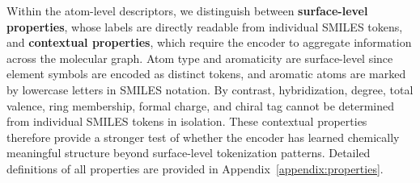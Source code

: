 Within the atom-level descriptors, we distinguish between \textbf{surface-level properties}, whose labels are directly readable from individual SMILES tokens, and \textbf{contextual properties}, which require the encoder to aggregate information across the molecular graph. Atom type and aromaticity are surface-level since element symbols are encoded as distinct tokens, and aromatic atoms are marked by lowercase letters in SMILES notation. By contrast, hybridization, degree, total valence, ring membership, formal charge, and chiral tag cannot be determined from individual SMILES tokens in isolation. These contextual properties therefore provide a stronger test of whether the encoder has learned chemically meaningful structure beyond surface-level tokenization patterns. Detailed definitions of all properties are provided in Appendix~\ref{appendix:properties}.







